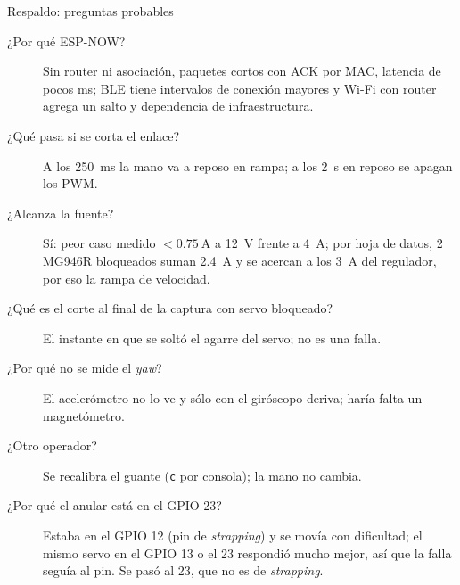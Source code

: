 \documentclass[aspectratio=169,10pt]{beamer}
\begin{document}
\begin{frame}{Respaldo: preguntas probables}
  \small
  \begin{description}
    \item[¿Por qué ESP-NOW?] Sin router ni asociación, paquetes cortos con ACK por MAC, latencia de pocos ms; BLE tiene intervalos de conexión mayores y Wi-Fi con router agrega un salto y dependencia de infraestructura.
    \item[¿Qué pasa si se corta el enlace?] A los \SI{250}{\milli\second} la mano va a reposo en rampa; a los \SI{2}{\second} en reposo se apagan los PWM.
    \item[¿Alcanza la fuente?] Sí: peor caso medido $<\SI{0.75}{\ampere}$ a \SI{12}{\volt} frente a \SI{4}{\ampere}; por hoja de datos, 2 MG946R bloqueados suman \SI{2.4}{\ampere} y se acercan a los \SI{3}{\ampere} del regulador, por eso la rampa de velocidad.
    \item[¿Qué es el corte al final de la captura con servo bloqueado?] El instante en que se soltó el agarre del servo; no es una falla.
    \item[¿Por qué no se mide el \textit{yaw}?] El acelerómetro no lo ve y sólo con el giróscopo deriva; haría falta un magnetómetro.
    \item[¿Otro operador?] Se recalibra el guante (\texttt{c} por consola); la mano no cambia.
    \item[¿Por qué el anular está en el GPIO 23?] Estaba en el GPIO 12 (pin de \textit{strapping}) y se movía con dificultad; el mismo servo en el GPIO 13 o el 23 respondió mucho mejor, así que la falla seguía al pin. Se pasó al 23, que no es de \textit{strapping}.
  \end{description}
\end{frame}
\end{document}
